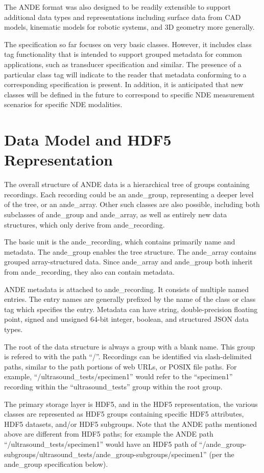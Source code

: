 \documentclass{article}
\begin{document}
The ANDE format was also designed to be readily extensible to support additional data types and representations including surface data from CAD models, kinematic models for robotic systems, and 3D geometry more generally.

The specification so far focuses on very basic classes. However, it includes class tag functionality that is intended to support grouped metadata for common applications, such as transducer specification and similar. The presence of a particular class tag will indicate to the reader that metadata conforming to a corresponding specification is present. In addition, it is anticipated that new classes will be defined in the future to correspond to specific NDE measurement scenarios for specific NDE modalities.

\section{Data Model and HDF5 Representation}

The overall structure of ANDE data is a hierarchical tree of groups containing
recordings. Each recording could be an ande\_group, representing a deeper level of the tree, or an ande\_array. Other such classes are also possible, including both subclasses of ande\_group and ande\_array, as well as entirely new data structures, which only derive from ande\_recording.

The basic unit is the ande\_recording, which contains primarily name and metadata. The ande\_group enables the tree structure. The ande\_array contains grouped array-structured data. Since ande\_array and ande\_group both inherit from ande\_recording, they also can contain metadata.

ANDE metadata is attached to ande\_recording. It consists of multiple named entries. The entry names are generally prefixed by the name of the class or class tag which specifies the entry. Metadata can have string, double-precision floating point, signed and unsigned 64-bit integer, boolean, and structured JSON data types.

The root of the data structure is always a group with a blank name. This group is refered to with the path ``/''. Recordings can be identified via slash-delimited paths, similar to the path portions of web URLs, or POSIX file paths. For example, ``/ultrasound\_tests/specimen1'' would refer to the ``specimen1'' recording within the ``ultrasound\_tests'' group within the root group.

The primary storage layer is HDF5, and in the HDF5 representation, the various classes are represented as HDF5 groups containing specific HDF5 attributes, HDF5 datasets, and/or HDF5 subgroups. Note that the ANDE paths mentioned above are different from HDF5 paths; for example the ANDE path ``/ultrasound\_tests/specimen1'' would have an HDF5 path of ``/ande\_group-subgroups/ultrasound\_tests/ande\_group-subgroups/specimen1'' (per the ande\_group specification below).
\end{document}
